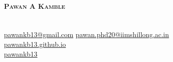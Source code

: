 \begin{minipage}[c]{0.05\textwidth}
\-\
\end{minipage}

\begin{minipage}[]{2\textwidth}
    \textbf{\huge \scshape{Pawan A Kamble \\}} \\
    \faPhone \hspace{3pt}{+91 7709021424} \\
    \faEnvelope \hspace{3pt}  \href{mailto:pawankb13@gmail.com}{pawankb13@gmail.com} \hspace{2em} \faEnvelope \hspace{3pt}  \href{mailto:pawan.phd20@iimshillong.ac.in}{pawan.phd20@iimshillong.ac.in}  \\
    \faGlobe \hspace{3pt} \href{https://pawankb13.github.io/}{pawankb13.github.io} \\
    \faLinkedin \hspace{3pt} \href{https://www.linkedin.com/in/pawankb13}{pawankb13}

\end{minipage}

\hfill
\begin{minipage}[c]{0.2\textwidth}
\end{minipage}
